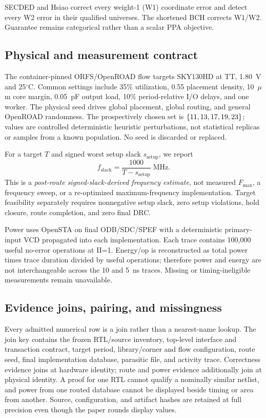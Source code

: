 \documentclass[conference,10pt]{IEEEtran}
\begin{document}
SECDED and Hsiao correct every weight-1 (W1) coordinate error and detect every W2 error in their qualified universes. The shortened BCH corrects W1/W2. Guarantee remains categorical rather than a scalar PPA objective.



\subsection{Physical and measurement contract}

The container-pinned ORFS/OpenROAD flow targets SKY130HD at TT, 1.80~V and 25$^\circ$C. Common settings include 35\% utilization, 0.55 placement density, 10~$\mu$m core margin, 0.05~pF output load, 10\% period-relative I/O delays, and one worker. The physical seed drives global placement, global routing, and general OpenROAD randomness. The prospectively chosen set is $\{11,13,17,19,23\}$; values are controlled deterministic heuristic perturbations, not statistical replicas or samples from a known population. No seed is discarded or replaced.

For a target $T$ and signed worst setup slack $s_{\mathrm{setup}}$, we report
\begin{equation}
 f_{\mathrm{slack}}=\frac{1000}{T-s_{\mathrm{setup}}}\;\mathrm{MHz}.
 \label{eq:fslack}
\end{equation}
This is a \emph{post-route signed-slack-derived frequency estimate}, not measured $F_{\max}$, a frequency sweep, or a re-optimized maximum-frequency implementation. Target feasibility separately requires nonnegative setup slack, zero setup violations, hold closure, route completion, and zero final DRC.

Power uses OpenSTA on final ODB/SDC/SPEF with a deterministic primary-input VCD propagated into each implementation. Each trace contains 100,000 useful no-error operations at II=1. Energy/op is reconstructed as total power times trace duration divided by useful operations; therefore power and energy are not interchangeable across the 10 and 5~ns traces. Missing or timing-ineligible measurements remain unavailable.

\subsection{Evidence joins, pairing, and missingness}

Every admitted numerical row is a join rather than a nearest-name lookup. The join key contains the frozen RTL/source inventory, top-level interface and transaction contract, target period, library/corner and flow configuration, route seed, final implementation database, parasitic file, and activity trace. Correctness evidence joins at hardware identity; route and power evidence additionally join at physical identity. A proof for one RTL cannot qualify a nominally similar netlist, and power from one routed database cannot be displayed beside timing or area from another. Source, configuration, and artifact hashes are retained at full precision even though the paper rounds display values.
\end{document}
